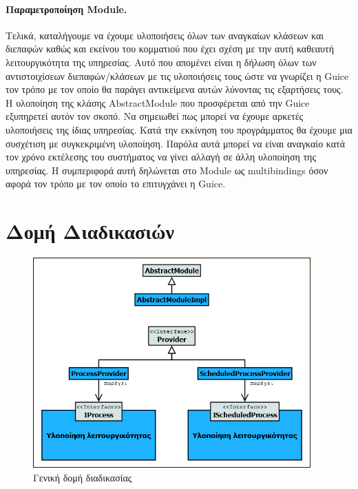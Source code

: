 \paragraph{Παραμετροποίηση Module.} Τελικά, καταλήγουμε να έχουμε υλοποιήσεις όλων 
των αναγκαίων κλάσεων και διεπαφών καθώς και εκείνου του κομματιού που 
έχει σχέση με την αυτή καθεαυτή λειτουργικότητα της υπηρεσίας. Αυτό που 
απομένει είναι η δήλωση όλων των αντιστοιχίσεων διεπαφών/κλάσεων με τις 
υλοποιήσεις τους ώστε να γνωρίζει η Guice τον τρόπο με τον οποίο θα 
παράγει αντικείμενα αυτών λύνοντας τις εξαρτήσεις τους. Η υλοποίηση της 
κλάσης AbstractModule που προσφέρεται από την Guice εξυπηρετεί αυτόν τον 
σκοπό. Να σημειωθεί πως μπορεί να έχουμε αρκετές υλοποιήσεις της ίδιας 
υπηρεσίας. Κατά την εκκίνηση του προγράμματος θα έχουμε μια συσχέτιση με 
συγκεκριμένη υλοποίηση. Παρόλα αυτά μπορεί να είναι αναγκαίο κατά τον 
χρόνο εκτέλεσης του συστήματος να γίνει αλλαγή σε άλλη υλοποίηση της 
υπηρεσίας. Η συμπεριφορά αυτή δηλώνεται στο Module ως multibindings όσον 
αφορά τον τρόπο με τον οποίο το επιτυγχάνει η Guice.

\section{Δομή Διαδικασιών}

\begin{figure}[htbp]
  \begin{center}
    \includegraphics[width=0.95\textwidth]{Figures/Architecture/General_process_structure.png}
  \end{center}
  \caption{Γενική δομή διαδικασίας}
  \label{fig:ProcessStructure}
\end{figure}

